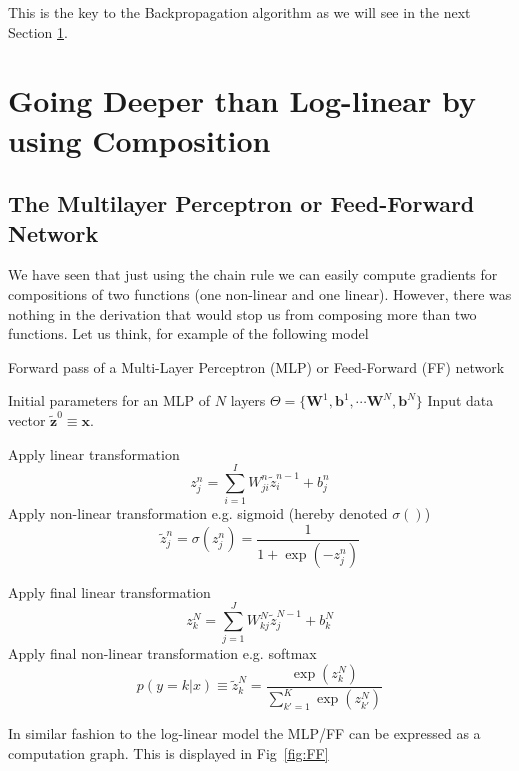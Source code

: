 \noindent This is the key to the Backpropagation algorithm as we will see in the next Section \ref{sec:deep_forward}.

\section{Going Deeper than Log-linear by using Composition}
\label{sec:deep_forward}

\subsection{The Multilayer Perceptron or Feed-Forward Network}

We have seen that just using the chain rule we can easily compute gradients for
compositions of two functions (one non-linear and one linear). However, there
was nothing in the derivation that would stop us from composing more than two
functions. Let us think, for example of the following model

\begin{algorithm}[th!]
\label{algo:mlpforward}
   \caption{Forward pass of a Multi-Layer Perceptron (MLP) or Feed-Forward (FF) network\label{alg:mlpforward}}
\begin{algorithmic}[1]

    Initial parameters for an MLP of $N$ layers $\Theta=\{\mathbf{W}^1, \mathbf{b}^1, \cdots \mathbf{W}^N, \mathbf{b}^N\}$
    Input data vector $\mathbf{\tilde{z}}^{0}  \equiv \mathbf{x}$. 

     \STATE Apply  linear transformation 
        $$z_j^n = \sum_{i=1}^{I} W_{ji}^n \tilde{z}_i^{n-1} + b_j^n$$
     \STATE Apply non-linear transformation e.g. sigmoid (hereby denoted $\sigma()$)
     $$\tilde{z}_j^n = \sigma(z_j^n)  = \frac{1}{1+\exp(-z_j^n)}$$

	\ENDFOR

\STATE Apply final linear transformation 
   $$z_k^N = \sum_{j=1}^{J} W_{kj}^N \tilde{z}_j^{N-1} + b_k^N$$
\STATE Apply final non-linear transformation e.g. softmax 
$$p(y=k|{x}) \equiv \tilde{z}_k^N = \frac{\exp(z_k^N)}{\sum_{k'=1}^{K} \exp(z_{k'}^N)}$$

\end{algorithmic}
\end{algorithm}

\noindent In similar fashion to the log-linear model the MLP/FF can be expressed as a computation graph. This is displayed in Fig~\ref{fig:FF}

